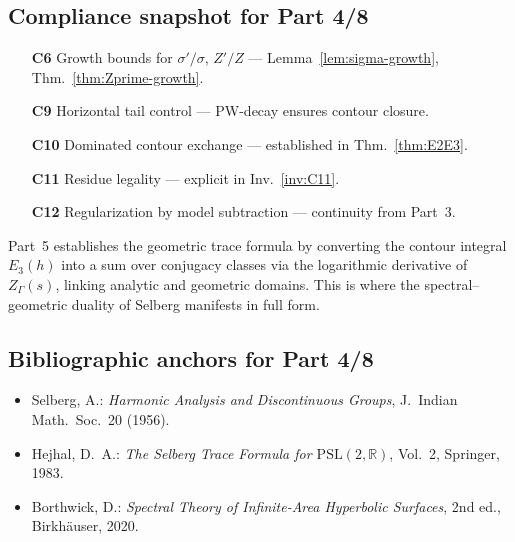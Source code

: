 \subsection{Compliance snapshot for Part 4/8}
\label{subsec:ch4-part4-compliance} \relax

\begin{itemize}
  \item[\textbf{C6}] Growth bounds for $\sigma'/\sigma$, $Z'/Z$ — Lemma~\ref{lem:sigma-growth}, Thm.~\ref{thm:Zprime-growth}. %
  \item[\textbf{C9}] Horizontal tail control — PW-decay ensures contour closure. %
  \item[\textbf{C10}] Dominated contour exchange — established in Thm.~\ref{thm:E2E3}. %
  \item[\textbf{C11}] Residue legality — explicit in Inv.~\ref{inv:C11}. %
  \item[\textbf{C12}] Regularization by model subtraction — continuity from Part~3. %
\end{itemize}

\begin{remark}
\label{rem:forward-part5}
Part~5 establishes the geometric trace formula by converting the contour integral $E_3(h)$ into a sum over conjugacy classes via the logarithmic derivative of $Z_\Gamma(s)$, linking analytic and geometric domains. This is where the spectral–geometric duality of Selberg manifests in full form. \relax
\end{remark}

\subsection{Bibliographic anchors for Part 4/8}
\label{subsec:ch4-part4-bib-anchors} \relax

\begin{itemize}
  \item Selberg, A.: \emph{Harmonic Analysis and Discontinuous Groups}, J.\ Indian Math.\ Soc.\ 20 (1956). %
  \item Hejhal, D.~A.: \emph{The Selberg Trace Formula for $\mathrm{PSL}(2,\mathbb{R})$}, Vol.~2, Springer, 1983. %
  \item Borthwick, D.: \emph{Spectral Theory of Infinite-Area Hyperbolic Surfaces}, 2nd ed., Birkhäuser, 2020. %
\end{itemize}


